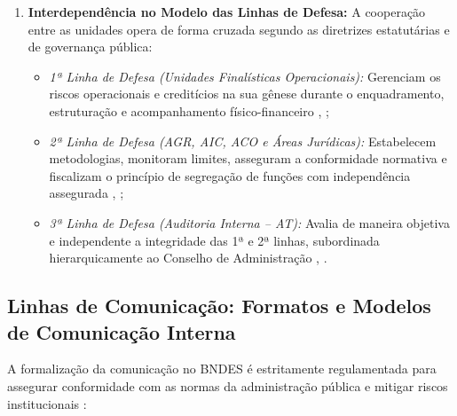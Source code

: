 \begin{enumerate}[label=\textbf{\arabic*.}]
    \item \textbf{Interdependência no Modelo das Linhas de Defesa:} A cooperação entre as unidades opera de forma cruzada segundo as diretrizes estatutárias e de governança pública:
          \begin{itemize}
              \item \emph{1ª Linha de Defesa (Unidades Finalísticas Operacionais):} Gerenciam os riscos operacionais e creditícios na sua gênese durante o enquadramento, estruturação e acompanhamento físico-financeiro \cite[art.~7º,~I]{bndes2025estatuto}, \cite[p.~45, 63]{bndes2026oib};
              \item \emph{2ª Linha de Defesa (AGR, AIC, ACO e Áreas Jurídicas):} Estabelecem metodologias, monitoram limites, asseguram a conformidade normativa e fiscalizam o princípio de segregação de funções com independência assegurada \cite[arts.~73,~\S~3º e 74]{bndes2025estatuto}, \cite[p.~21, 33, 35, 172]{bndes2026oib};
              \item \emph{3ª Linha de Defesa (Auditoria Interna -- AT):} Avalia de maneira objetiva e independente a integridade das 1ª e 2ª linhas, subordinada hierarquicamente ao Conselho de Administração \cite[arts.~52 e 57]{bndes2025estatuto}, \cite[p.~11, item II.2; p.~13]{bndes2026oib}.
          \end{itemize}
\end{enumerate}

\subsection{Linhas de Comunicação: Formatos e Modelos de Comunicação Interna}

A formalização da comunicação no BNDES é estritamente regulamentada para assegurar conformidade com as normas da administração pública e mitigar riscos institucionais \cite{bndes2025estatuto, bndes2026oib}:

